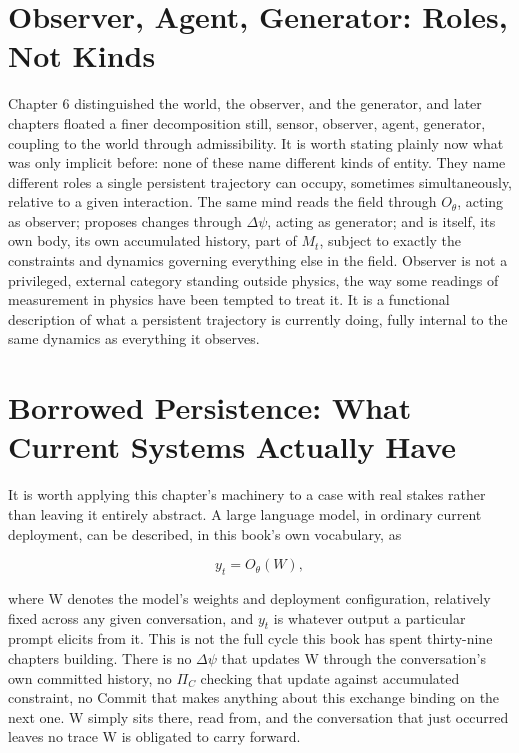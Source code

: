 \section{Observer, Agent, Generator: Roles, Not Kinds}

Chapter 6 distinguished the world, the observer, and the generator, and later chapters floated a finer decomposition still, sensor, observer, agent, generator, coupling to the world through admissibility. It is worth stating plainly now what was only implicit before: none of these name different kinds of entity. They name different roles a single persistent trajectory can occupy, sometimes simultaneously, relative to a given interaction. The same mind reads the field through \(O_\theta\), acting as observer; proposes changes through \(\Delta\psi\), acting as generator; and is itself, its own body, its own accumulated history, part of \(M_t\), subject to exactly the constraints and dynamics governing everything else in the field. Observer is not a privileged, external category standing outside physics, the way some readings of measurement in physics have been tempted to treat it. It is a functional description of what a persistent trajectory is currently doing, fully internal to the same dynamics as everything it observes.

\section{Borrowed Persistence: What Current Systems Actually Have}

It is worth applying this chapter's machinery to a case with real stakes rather than leaving it entirely abstract. A large language model, in ordinary current deployment, can be described, in this book's own vocabulary, as

\[ y_t = O_\theta(W), \]

where W denotes the model's weights and deployment configuration, relatively fixed across any given conversation, and \(y_t\) is whatever output a particular prompt elicits from it. This is not the full cycle this book has spent thirty-nine chapters building. There is no \(\Delta\psi\) that updates W through the conversation's own committed history, no \(\Pi_C\) checking that update against accumulated constraint, no Commit that makes anything about this exchange binding on the next one. W simply sits there, read from, and the conversation that just occurred leaves no trace W is obligated to carry forward.

